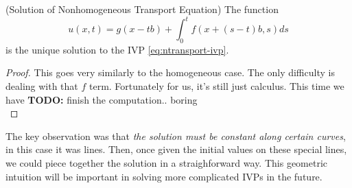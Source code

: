 \documentclass{bkcnotes}
\newcommand{\todo}[1]{{\bf TODO: } #1\\}
\begin{document}
\begin{nthm}(Solution of Nonhomogeneous Transport Equation)
  The function
  \begin{equation}
    \label{eq:ntransport-sol}
    u(x,t) = g(x-tb) + \int_0^t f(x+(s-t)b,s)ds
  \end{equation}
  is the unique solution to the IVP \eqref{eq:ntransport-ivp}.
\end{nthm}
\begin{proof}
  This goes very similarly to the homogeneous case. The only
  difficulty is dealing with that $f$ term. Fortunately for us, it's
  still just calculus. This time we have
  \todo{finish the computation.. boring}
\end{proof}

The key observation was that \emph{the solution must be constant along
  certain curves}, in this case it was lines. Then, once given the
initial values on these special lines, we could piece together the
solution in a straighforward way. This geometric intuition will be
important in solving more complicated IVPs in the future.
\end{document}
